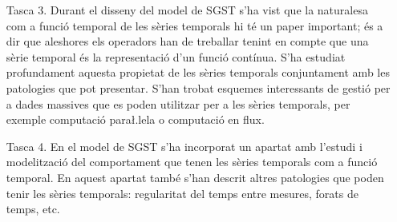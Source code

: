 \begin{enumerate}








\item[Tasca 3.] Durant el disseny del model de SGST s'ha vist que la
  naturalesa com a funció temporal de les sèries temporals hi té un
  paper important; és a dir que aleshores els operadors han de
  treballar tenint en compte que una sèrie temporal és la
  representació d'un funció contínua. S'ha estudiat profundament
  aquesta propietat de les sèries temporals conjuntament amb les
  patologies que pot presentar. S'han trobat esquemes interessants de
  gestió per a dades massives que es poden utilitzar per a les sèries
  temporals, per exemple computació para\l.lela o computació en flux.



\item[Tasca 4.] En el model de SGST s'ha incorporat un apartat amb
  l'estudi i modelització del comportament que tenen les sèries
  temporals com a funció temporal. En aquest apartat també s'han
  descrit altres patologies que poden tenir les sèries temporals:
  regularitat del temps entre mesures, forats de temps, etc.



\end{enumerate}
